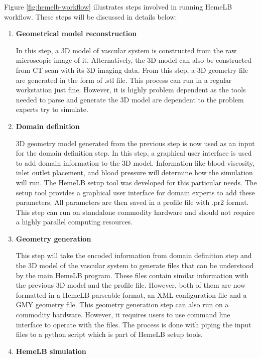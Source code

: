 Figure \ref{fig:hemelb-workflow} illustrates steps involved in running HemeLB workflow. These steps will be discussed in details below:

\begin{enumerate}

\item{\textbf{Geometrical model reconstruction}}

In this step, a 3D model of vascular system is constructed from the raw microscopic image of it. Alternatively, the 3D model can also be constructed from CT scan with its 3D imaging data. From this step, a 3D geometry file are generated in the form of .stl file. This process can run in a regular workstation just fine. However, it is highly problem dependent as the tools needed to parse and generate the 3D model are dependent to the problem experts try to simulate.

\item{\textbf{Domain definition}}

3D geometry model generated from the previous step is now used as an input for the domain definition step. In this step, a graphical user interface is used to add domain information to the 3D model. Information like blood viscosity, inlet outlet placement, and blood pressure will determine how the simulation will run. The HemeLB setup tool was developed for this particular needs. The setup tool provides a graphical user interface for domain experts to add these parameters. All parameters are then saved in a profile file with .pr2 format. This step can run on standalone commodity hardware and should not require a highly parallel computing resources.

\item{\textbf{Geometry generation}}

This step will take the encoded information from domain definition step and the 3D model of the vascular system to generate files that can be understood by the main HemeLB program. These files contain similar information with the previous 3D model and the profile file. However, both of them are now formatted in a HemeLB parseable format, an XML configuration file and a GMY geometry file. This geometry generation step can also run on a commodity hardware. However, it requires users to use command line interface to operate with the files. The process is done with piping the input files to a python script which is part of HemeLB setup tools.

\item{\textbf{HemeLB simulation}}


\end{enumerate}
